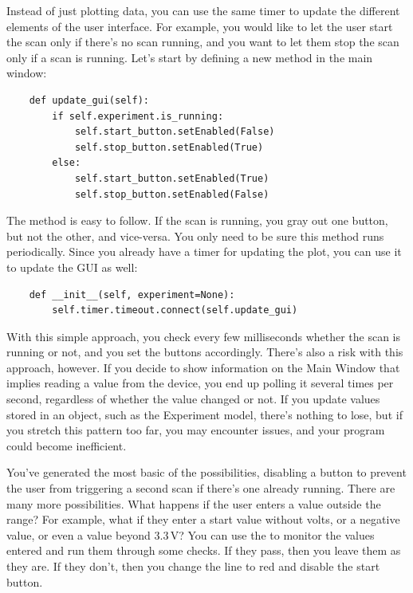 Instead of just plotting data, you can use the same timer to update the different elements of the user interface. For example, you would like to let the user start the scan only if there's no scan running, and you want to let them stop the scan only if a scan is running. Let's start by defining a new method in the main window:

\begin{verbatim}
    def update_gui(self):
        if self.experiment.is_running:
            self.start_button.setEnabled(False)
            self.stop_button.setEnabled(True)
        else:
            self.start_button.setEnabled(True)
            self.stop_button.setEnabled(False)
\end{verbatim}

The method  is easy to follow. If the scan is running, you gray out one button, but not the other, and vice-versa. You only need to be sure this method runs periodically. Since you already have a timer for updating the plot, you can use it to update the GUI as well:

\begin{verbatim}
    def __init__(self, experiment=None):
        self.timer.timeout.connect(self.update_gui)
\end{verbatim}

With this simple approach, you check every few milliseconds whether the scan is running or not, and you set the buttons accordingly. There's also a risk with this approach, however. If you decide to show information on the Main Window that implies reading a value from the device, you end up polling it several times per second, regardless of whether the value changed or not. If you update values stored in an object, such as the Experiment model, there's nothing to lose, but if you stretch this pattern too far, you may encounter issues, and your program could become inefficient.

You've generated the most basic of the possibilities, disabling a button to prevent the user from triggering a second scan if there's one already running. There are many more possibilities. What happens if the user enters a value outside the range? For example, what if they enter a start value without volts, or a negative value, or even a value beyond $3.3\,\textrm{V}$? You can use the  to monitor the values entered and run them through some checks. If they pass, then you leave them as they are. If they don't, then you change the line to red and disable the start button.

